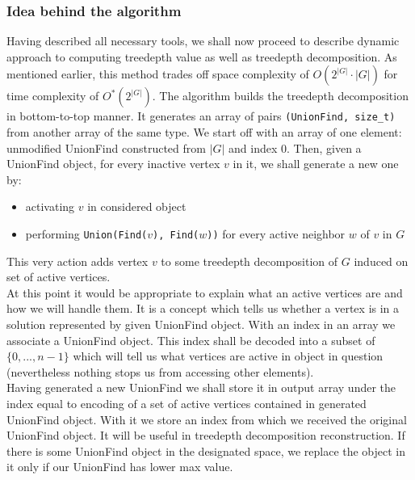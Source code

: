 \subsubsection{Idea behind the algorithm}
Having described all necessary tools, we shall now proceed to describe dynamic approach to computing treedepth value as well as treedepth decomposition. As mentioned earlier, this method trades off space complexity of $O\left(2^{\left|G\right|}\cdot\left|G\right|\right)$ for time complexity of  $O^{*}\left(2^{\left|G\right|}\right)$.
The algorithm builds the treedepth decomposition in bottom-to-top manner. It generates an array of pairs \texttt{(UnionFind, size\_t)} from another array of the same type. We start off with an array of one element: unmodified UnionFind constructed from $\left|G\right|$ and index 0. Then, given a UnionFind object, for every inactive vertex $v$ in it, we shall generate a new one by:
\begin{itemize}
	\item activating $v$ in considered object
	\item performing \texttt{Union(Find($v$), Find($w$))} for every active neighbor $w$ of $v$ in $G$
\end{itemize}
This very action adds vertex $v$ to some treedepth decomposition of $G$ induced on set of active vertices.\\
At this point it would be appropriate to explain what an active vertices are and how we will handle them. It is a concept which tells us whether a vertex is in a solution represented by given UnionFind object. With an index in an array we associate a UnionFind object. This index shall be decoded into a subset of $\{0,...,n-1\}$ which will tell us what vertices are active in object in question (nevertheless nothing stops us from accessing other elements).\\
Having generated a new UnionFind we shall store it in output array under the index equal to encoding of a set of active vertices contained in generated UnionFind object. With it we store an index from which we received the original UnionFind object. It will be useful in treedepth decomposition reconstruction. If there is some UnionFind object in the designated space, we replace the object in it only if our UnionFind has lower max value.
